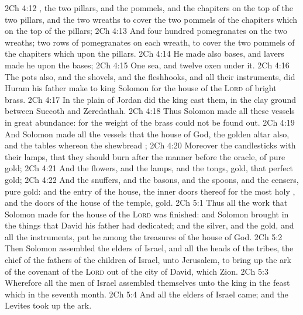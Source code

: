 \vs 2Ch 4:12 , the two pillars, and the pommels, and the chapiters  on the top of the two pillars, and the two wreaths to cover the two pommels of the chapiters which  on the top of the pillars;
\vs 2Ch 4:13 And four hundred pomegranates on the two wreaths; two rows of pomegranates on each wreath, to cover the two pommels of the chapiters which  upon the pillars.
\vs 2Ch 4:14 He made also bases, and lavers made he upon the bases;
\vs 2Ch 4:15 One sea, and twelve oxen under it.
\vs 2Ch 4:16 The pots also, and the shovels, and the fleshhooks, and all their instruments, did Huram his father make to king Solomon for the house of the \textsc{Lord} of bright brass.
\vs 2Ch 4:17 In the plain of Jordan did the king cast them, in the clay ground between Succoth and Zeredathah.
\vs 2Ch 4:18 Thus Solomon made all these vessels in great abundance: for the weight of the brass could not be found out.
\vs 2Ch 4:19 And Solomon made all the vessels that  the house of God, the golden altar also, and the tables whereon the shewbread ;
\vs 2Ch 4:20 Moreover the candlesticks with their lamps, that they should burn after the manner before the oracle, of pure gold;
\vs 2Ch 4:21 And the flowers, and the lamps, and the tongs,  gold,  that perfect gold;
\vs 2Ch 4:22 And the snuffers, and the basons, and the spoons, and the censers,  pure gold: and the entry of the house, the inner doors thereof for the most holy , and the doors of the house of the temple,  gold.
\vs 2Ch 5:1 Thus all the work that Solomon made for the house of the \textsc{Lord} was finished: and Solomon brought in  the things that David his father had dedicated; and the silver, and the gold, and all the instruments, put he among the treasures of the house of God.
\vs 2Ch 5:2 Then Solomon assembled the elders of Israel, and all the heads of the tribes, the chief of the fathers of the children of Israel, unto Jerusalem, to bring up the ark of the covenant of the \textsc{Lord} out of the city of David, which  Zion.
\vs 2Ch 5:3 Wherefore all the men of Israel assembled themselves unto the king in the feast which  in the seventh month.
\vs 2Ch 5:4 And all the elders of Israel came; and the Levites took up the ark.
